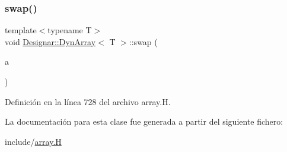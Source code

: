 \mbox{\label{class_designar_1_1_dyn_array_a70d4d7e34ed05280f849adb6aa20180d}} 
\subsubsection{\texorpdfstring{swap()}{swap()}}
{\footnotesize\ttfamily template$<$typename T$>$ \\
void \hyperlink{class_designar_1_1_dyn_array}{Designar\+::\+Dyn\+Array}$<$ T $>$\+::swap (\begin{DoxyParamCaption}\item[{\hyperlink{class_designar_1_1_dyn_array}{Dyn\+Array}$<$ T $>$ \&}]{a }\end{DoxyParamCaption})\hspace{0.3cm}{\ttfamily [inline]}}



Definición en la línea 728 del archivo array.\+H.



La documentación para esta clase fue generada a partir del siguiente fichero\+:\begin{DoxyCompactItemize}
\item 
include/\hyperlink{array_8_h}{array.\+H}\end{DoxyCompactItemize}
